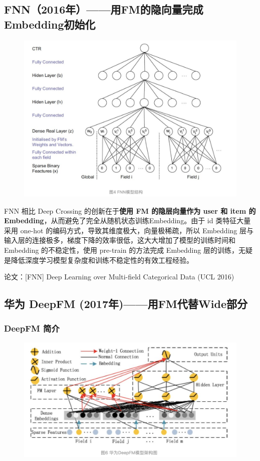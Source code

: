 \documentclass[12pt]{article}
\begin{document}
\subsection{FNN（2016年）——用FM的隐向量完成Embedding初始化}
\begin{figure}[H]
    \centering
    \includegraphics[width=.6\textwidth]{fig/FNN_Structure.png}
\end{figure}

FNN 相比 Deep Crossing 的创新在于\textbf{使用 FM 的隐层向量作为 user 和 item 的 Embedding}，从而避免了完全从随机状态训练Embedding。由于 id 类特征大量采用 one-hot 的编码方式，导致其维度极大，向量极稀疏，所以 Embedding 层与输入层的连接极多，梯度下降的效率很低，这大大增加了模型的训练时间和 Embedding 的不稳定性，使用 pre-train 的方法完成 Embedding 层的训练，无疑是降低深度学习模型复杂度和训练不稳定性的有效工程经验。

论文：[FNN] Deep Learning over Multi-field Categorical Data (UCL 2016)




\subsection{华为 DeepFM (2017年)——用FM代替Wide部分}
\subsubsection{DeepFM 简介}
\begin{figure}[H]
    \centering
    \includegraphics[width=.8\textwidth]{fig/Huawei_DeepFM_Structure.png}
\end{figure}
\end{document}
